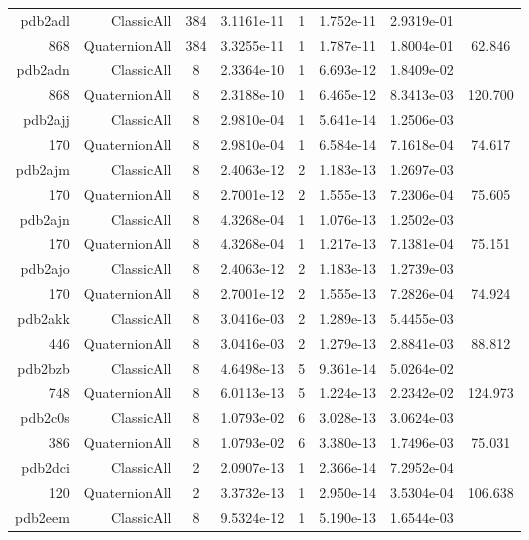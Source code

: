 \begin{xltabular}{\textwidth}{r|rcS[table-format=1.4e+2]cS[table-format=1.3e+2]S[table-format=1.4e+2]S[table-format=-1.3]}
pdb2adl & ClassicAll & 384 & 3.1161e-11 & 1 & 1.752e-11 & 2.9319e-01 & \\
868 & QuaternionAll & 384 & 3.3255e-11 & 1 & 1.787e-11 & 1.8004e-01 & 62.846\\  \addlinespace
pdb2adn & ClassicAll & 8 & 2.3364e-10 & 1 & 6.693e-12 & 1.8409e-02 & \\
868 & QuaternionAll & 8 & 2.3188e-10 & 1 & 6.465e-12 & 8.3413e-03 & 120.700\\  \addlinespace
pdb2ajj & ClassicAll & 8 & 2.9810e-04 & 1 & 5.641e-14 & 1.2506e-03 & \\
170 & QuaternionAll & 8 & 2.9810e-04 & 1 & 6.584e-14 & 7.1618e-04 & 74.617\\  \addlinespace
pdb2ajm & ClassicAll & 8 & 2.4063e-12 & 2 & 1.183e-13 & 1.2697e-03 & \\
170 & QuaternionAll & 8 & 2.7001e-12 & 2 & 1.555e-13 & 7.2306e-04 & 75.605\\  \addlinespace
pdb2ajn & ClassicAll & 8 & 4.3268e-04 & 1 & 1.076e-13 & 1.2502e-03 & \\
170 & QuaternionAll & 8 & 4.3268e-04 & 1 & 1.217e-13 & 7.1381e-04 & 75.151\\  \addlinespace
pdb2ajo & ClassicAll & 8 & 2.4063e-12 & 2 & 1.183e-13 & 1.2739e-03 & \\
170 & QuaternionAll & 8 & 2.7001e-12 & 2 & 1.555e-13 & 7.2826e-04 & 74.924\\  \addlinespace
pdb2akk & ClassicAll & 8 & 3.0416e-03 & 2 & 1.289e-13 & 5.4455e-03 & \\
446 & QuaternionAll & 8 & 3.0416e-03 & 2 & 1.279e-13 & 2.8841e-03 & 88.812\\  \addlinespace
pdb2bzb & ClassicAll & 8 & 4.6498e-13 & 5 & 9.361e-14 & 5.0264e-02 & \\
748 & QuaternionAll & 8 & 6.0113e-13 & 5 & 1.224e-13 & 2.2342e-02 & 124.973\\  \addlinespace
pdb2c0s & ClassicAll & 8 & 1.0793e-02 & 6 & 3.028e-13 & 3.0624e-03 & \\
386 & QuaternionAll & 8 & 1.0793e-02 & 6 & 3.380e-13 & 1.7496e-03 & 75.031\\  \addlinespace
pdb2dci & ClassicAll & 2 & 2.0907e-13 & 1 & 2.366e-14 & 7.2952e-04 & \\
120 & QuaternionAll & 2 & 3.3732e-13 & 1 & 2.950e-14 & 3.5304e-04 & 106.638\\  \addlinespace
pdb2eem & ClassicAll & 8 & 9.5324e-12 & 1 & 5.190e-13 & 1.6544e-03 & \\

\end{xltabular}
